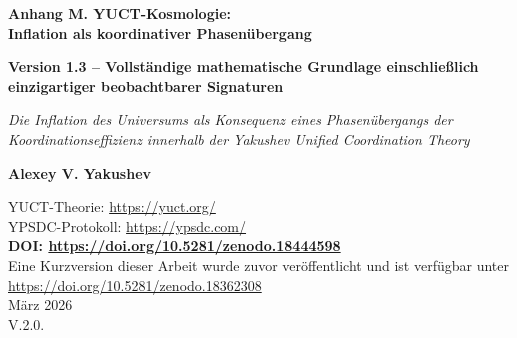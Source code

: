 \documentclass[12pt]{article}
\theoremstyle{remark}
\begin{document}
	
	\begin{titlepage}
		\begin{center}
			\vspace*{0cm}
			
			\Huge\textbf{Anhang M. YUCT-Kosmologie: \\ Inflation als koordinativer Phasenübergang}
			
			\vspace{0.5cm}
			
			\Large\textbf{Version 1.3 – Vollständige mathematische Grundlage einschließlich einzigartiger beobachtbarer Signaturen}
			
			\vspace{0.5cm}
			
			\large\textit{Die Inflation des Universums als Konsequenz eines Phasenübergangs der Koordinationseffizienz innerhalb der Yakushev Unified Coordination Theory}
			
			\vspace{0.5cm}
			
			\normalsize\textbf{Alexey V. Yakushev}
			
			YUCT-Theorie: \url{https://yuct.org/}\\
			YPSDC-Protokoll: \url{https://ypsdc.com/}\\
			
			\vspace{1.5cm}
			\textbf{DOI: \url{https://doi.org/10.5281/zenodo.18444598}}\\
			
			\vspace{0.5cm}
			Eine Kurzversion dieser Arbeit wurde zuvor veröffentlicht und ist verfügbar unter\\ \url{https://doi.org/10.5281/zenodo.18362308}\\
			\vspace{0.5cm}
			März 2026 \\ \large V.2.0.
			

\end{center}
\end{titlepage}
\end{document}
